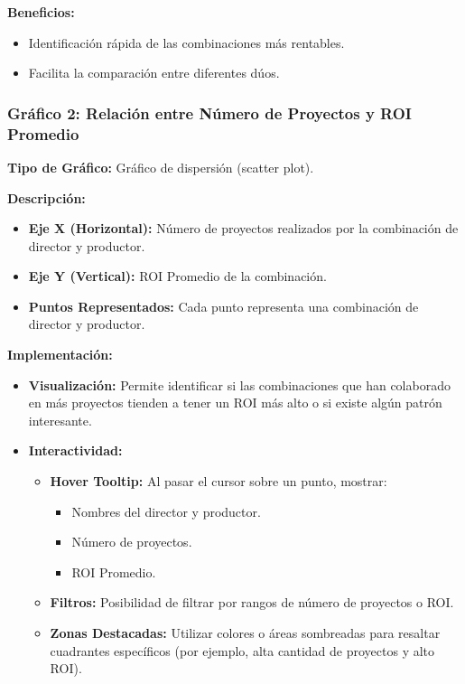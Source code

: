 \documentclass[11pt]{opticajnl}
\begin{document}
\textbf{Beneficios:}

\begin{itemize}
    \item Identificación rápida de las combinaciones más rentables.
    \item Facilita la comparación entre diferentes dúos.
\end{itemize}

\subsubsection{Gráfico 2: Relación entre Número de Proyectos y ROI Promedio}

\textbf{Tipo de Gráfico:} Gráfico de dispersión (scatter plot).

\textbf{Descripción:}

\begin{itemize}
    \item \textbf{Eje X (Horizontal):} Número de proyectos realizados por la combinación de director y productor.
    \item \textbf{Eje Y (Vertical):} ROI Promedio de la combinación.
    \item \textbf{Puntos Representados:} Cada punto representa una combinación de director y productor.
\end{itemize}

\textbf{Implementación:}

\begin{itemize}
    \item \textbf{Visualización:} Permite identificar si las combinaciones que han colaborado en más proyectos tienden a tener un ROI más alto o si existe algún patrón interesante.
    \item \textbf{Interactividad:}
    \begin{itemize}
        \item \textbf{Hover Tooltip:} Al pasar el cursor sobre un punto, mostrar:
        \begin{itemize}
            \item Nombres del director y productor.
            \item Número de proyectos.
            \item ROI Promedio.
        \end{itemize}
        \item \textbf{Filtros:} Posibilidad de filtrar por rangos de número de proyectos o ROI.
        \item \textbf{Zonas Destacadas:} Utilizar colores o áreas sombreadas para resaltar cuadrantes específicos (por ejemplo, alta cantidad de proyectos y alto ROI).
    \end{itemize}
\end{itemize}
\end{document}
